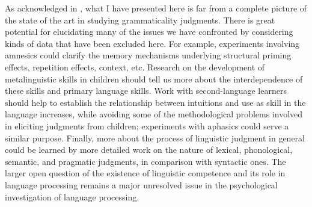  As acknowledged in , what I have presented here is far from a complete picture of the state of the art in studying grammaticality judgments. There is great potential for elucidating many of the issues we have confronted by considering kinds of data that have been excluded here. For example, experiments involving amnesics could clarify the memory mechanisms underlying structural priming effects, repetition effects, context, etc. Research on the development of metalinguistic skills in children should tell us more about the interdependence of these skills and primary language skills. Work with second-language learners should help to establish the relationship between intuitions and use as skill in the language increases, while avoiding some of the methodological problems involved in eliciting judgments from children; experiments with aphasics could serve a similar purpose. Finally, more about the process of linguistic judgment in general could be learned by more detailed work on the nature of lexical, phonological, semantic, and pragmatic judgments, in comparison with syntactic ones. The larger open question of the existence of linguistic competence and its role in language processing remains a major unresolved issue in the psychological investigation of language processing.


